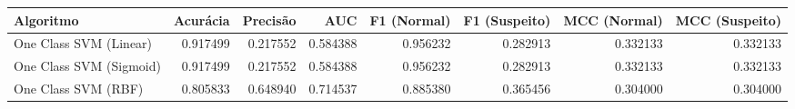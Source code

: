 \begin{tabular}{lrrrrrrr}
\toprule
               Algoritmo &  Acurácia &  Precisão &      AUC &  F1 (Normal) &  F1 (Suspeito) &  MCC (Normal) &  MCC (Suspeito) \\
\midrule
  One Class SVM (Linear) &  0.917499 &  0.217552 & 0.584388 &     0.956232 &       0.282913 &      0.332133 &        0.332133 \\
One Class SVM (Sigmoid) &  0.917499 &  0.217552 & 0.584388 &     0.956232 &       0.282913 &      0.332133 &        0.332133 \\
     One Class SVM (RBF) &  0.805833 &  0.648940 & 0.714537 &     0.885380 &       0.365456 &      0.304000 &        0.304000 \\
\bottomrule
\end{tabular}
